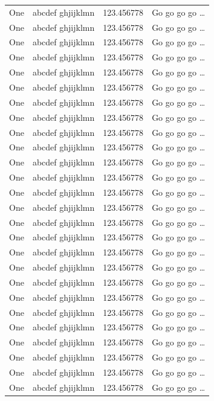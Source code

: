 \documentclass[phd,showgrids]{ndsu-thesis-2022}
\begin{document}
\begin{longtable}{l l l l}
One & abcdef ghjijklmn & 123.456778  & Go go go go \ldots \\
One & abcdef ghjijklmn & 123.456778  & Go go go go \ldots \\
One & abcdef ghjijklmn & 123.456778  & Go go go go \ldots \\
One & abcdef ghjijklmn & 123.456778  & Go go go go \ldots \\
One & abcdef ghjijklmn & 123.456778  & Go go go go \ldots \\
One & abcdef ghjijklmn & 123.456778  & Go go go go \ldots \\
One & abcdef ghjijklmn & 123.456778  & Go go go go \ldots \\
One & abcdef ghjijklmn & 123.456778  & Go go go go \ldots \\
One & abcdef ghjijklmn & 123.456778  & Go go go go \ldots \\
One & abcdef ghjijklmn & 123.456778  & Go go go go \ldots \\
One & abcdef ghjijklmn & 123.456778  & Go go go go \ldots \\
One & abcdef ghjijklmn & 123.456778  & Go go go go \ldots \\
One & abcdef ghjijklmn & 123.456778  & Go go go go \ldots \\
One & abcdef ghjijklmn & 123.456778  & Go go go go \ldots \\
One & abcdef ghjijklmn & 123.456778  & Go go go go \ldots \\
One & abcdef ghjijklmn & 123.456778  & Go go go go \ldots \\
One & abcdef ghjijklmn & 123.456778  & Go go go go \ldots \\
One & abcdef ghjijklmn & 123.456778  & Go go go go \ldots \\
One & abcdef ghjijklmn & 123.456778  & Go go go go \ldots \\
One & abcdef ghjijklmn & 123.456778  & Go go go go \ldots \\
One & abcdef ghjijklmn & 123.456778  & Go go go go \ldots \\
One & abcdef ghjijklmn & 123.456778  & Go go go go \ldots \\
One & abcdef ghjijklmn & 123.456778  & Go go go go \ldots \\
One & abcdef ghjijklmn & 123.456778  & Go go go go \ldots \\
One & abcdef ghjijklmn & 123.456778  & Go go go go \ldots \\
One & abcdef ghjijklmn & 123.456778  & Go go go go \ldots \\

\end{longtable}
\end{document}
